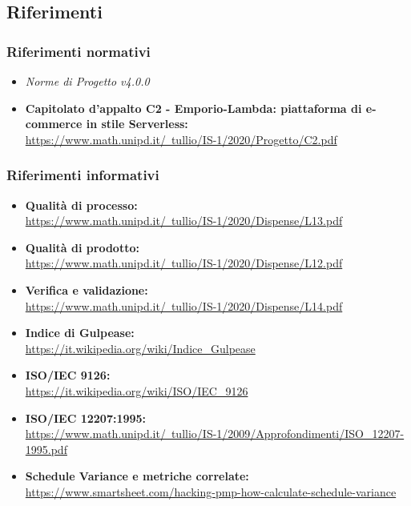 \subsection{Riferimenti}
\subsubsection{Riferimenti normativi}
\begin{itemize}
    \item \textit{Norme di Progetto v4.0.0}
    \item \textbf{Capitolato d'appalto C2 - Emporio-Lambda: piattaforma di e-commerce in stile Serverless:} \\ \href{https://www.math.unipd.it/~tullio/IS-1/2020/Progetto/C2.pdf}{https://www.math.unipd.it/~tullio/IS-1/2020/Progetto/C2.pdf}
\end{itemize}
\subsubsection{Riferimenti informativi}
\begin{itemize}
    \item \textbf{Qualità di processo:} \\ \href{https://www.math.unipd.it/~tullio/IS-1/2020/Dispense/L13.pdf}{https://www.math.unipd.it/~tullio/IS-1/2020/Dispense/L13.pdf}
    \item \textbf{Qualità di prodotto:} \\ \href{https://www.math.unipd.it/~tullio/IS-1/2020/Dispense/L12.pdf}{https://www.math.unipd.it/~tullio/IS-1/2020/Dispense/L12.pdf}
    \item \textbf{Verifica e validazione:} \\ \href{https://www.math.unipd.it/~tullio/IS-1/2020/Dispense/L14.pdf}{https://www.math.unipd.it/~tullio/IS-1/2020/Dispense/L14.pdf}
    \item \textbf{Indice di Gulpease:} \\ \href{https://it.wikipedia.org/wiki/Indice\_Gulpease}{https://it.wikipedia.org/wiki/Indice\_Gulpease}
    \item \textbf{ISO/IEC 9126:} \\ \href{https://it.wikipedia.org/wiki/ISO/IEC\_9126}{https://it.wikipedia.org/wiki/ISO/IEC\_9126}
    \item \textbf{ISO/IEC 12207:1995:} \\ \href{https://www.math.unipd.it/~tullio/IS-1/2009/Approfondimenti/ISO\_12207-1995.pdf}{https://www.math.unipd.it/~tullio/IS-1/2009/Approfondimenti/ISO\_12207-1995.pdf}
    \item \textbf{Schedule Variance e metriche correlate:} \\ \href{https://www.smartsheet.com/hacking-pmp-how-calculate-schedule-variance}{https://www.smartsheet.com/hacking-pmp-how-calculate-schedule-variance}
\end{itemize}
\newpage